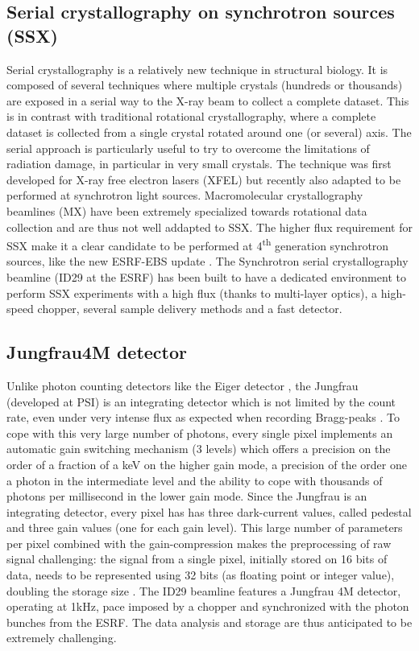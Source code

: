 \documentclass[a4paper,12pt,oneside]{article}              %
\begin{document}
\subsection{Serial crystallography on synchrotron sources (SSX)}
Serial crystallography is a relatively new technique in structural biology. 
It is composed of several techniques where multiple crystals (hundreds or thousands) are exposed in a serial way to the X-ray beam to collect a complete dataset. 
This is in contrast with traditional rotational crystallography, where a complete dataset is collected from a single crystal rotated around one (or several) axis. 
The serial approach is particularly useful to try to overcome the limitations of radiation damage, in particular in very small crystals.
The technique was first developed for X-ray free electron lasers (XFEL) \cite{Chapman2011}
but recently also adapted to be performed at synchrotron light sources.
Macromolecular crystallography beamlines (MX) have been extremely specialized towards rotational data collection and are thus not well addapted to SSX.
The higher flux requirement for SSX make it a clear candidate to be performed at 4\textsuperscript{th} generation synchrotron sources, like the new ESRF-EBS update \cite{EBS}.
The Synchrotron serial crystallography beamline (ID29 at the ESRF) has been built to have a dedicated environment to perform SSX experiments with a high flux (thanks to multi-layer optics), a high-speed chopper, several sample delivery methods and a fast detector.
\subsection{Jungfrau4M detector}
Unlike photon counting detectors like the Eiger detector \cite{Eiger}, the Jungfrau (developed at PSI) is an integrating detector which is not limited by the count rate, even under very intense flux as expected when recording Bragg-peaks \cite{jungfrau2016}.
To cope with this very large number of photons, every single pixel implements an automatic gain switching mechanism (3 levels) which offers a precision on the order of a fraction of a keV on the higher gain mode, a precision of the order one a photon in the intermediate level and the ability to cope with thousands of photons per millisecond in the lower gain mode.
Since the Jungfrau is an integrating detector, every pixel has has three dark-current values, called pedestal and three gain values (one for each gain level). 
This large number of parameters per pixel combined with the gain-compression makes the preprocessing of raw signal challenging: the signal from a single pixel, initially stored on 16 bits of data, needs to be represented using 32 bits (as floating point or integer value), doubling the storage size \cite{jungfrau_PSI}.
The ID29 beamline features a Jungfrau 4M detector, operating at 1kHz, pace imposed by a chopper and synchronized with the photon bunches from the ESRF.
The data analysis and storage are thus anticipated to be extremely challenging. 
\end{document}
